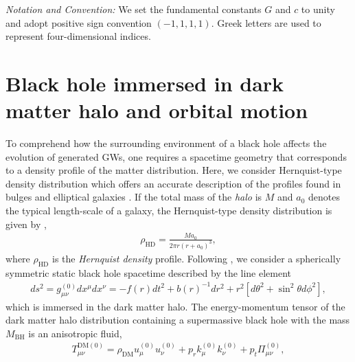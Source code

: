 \documentclass[11pt]{article}
\begin{document}
\par 
\textit{Notation and Convention: } We set the fundamental constants $G$ and $c$ to unity and  adopt positive sign convention $(-1,1,1,1)$. Greek letters are used to represent four-dimensional indices.

\section{Black hole immersed in dark matter halo and orbital motion}\label{BH}

To comprehend how the surrounding environment of a black hole affects the evolution of generated GWs, one requires a spacetime geometry that corresponds to a density profile of the matter distribution. Here, we consider Hernquist-type density distribution which offers an accurate description of the profiles found in bulges and elliptical galaxies \cite{1990ApJ...356..359H, PhysRevD.105.L061501}. If the total mass of the \textit{halo} is $M$ and $a_{0}$ denotes the typical length-scale of a galaxy, the Hernquist-type density distribution is given by \cite{1990ApJ...356..359H, PhysRevD.105.L061501},
\begin{align} \label{dmtt}
\rho_{\textrm{HD}} = \frac{M a_{0}}{2\pi r (r+a_{0})^{3}},
\end{align}
where $\rho_{\textrm{HD}}$ is the \textit{Hernquist density} profile. 
Following \cite{PhysRevD.105.L061501}, we consider a spherically symmetric static black hole spacetime described by the line element 
\begin{align}\label{met1}
    ds^{2} = g_{\mu\nu}^{(0)}dx^{\mu}dx^{\nu}=-f(r) dt^{2} + b(r)^{-1} dr^{2} + r^{2} \left[d\theta^{2}+\sin^{2}\theta d\phi^{2}\right],
\end{align}
which is immersed in the dark matter halo. The energy-momentum tensor of the dark  matter halo distribution containing a supermassive black hole with the mass $M_{\textrm{BH}}$ is an anisotropic fluid, %
\begin{align}\label{stt1}
T^{\textrm{DM}(0)}_{\mu\nu} = \rho_{\textrm{DM}} u_{\mu}^{(0)}u_{\nu}^{(0)}+p_{r}k_{\mu}^{(0)}k_{\nu}^{(0)}+p_{t}\Pi_{\mu\nu}^{(0)}, 
\end{align}
\end{document}
